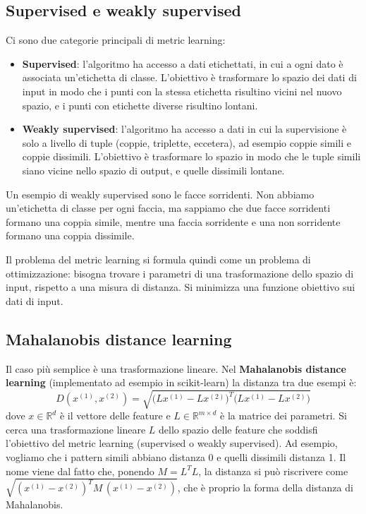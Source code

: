 \subsection{Supervised e weakly supervised}
Ci sono due categorie principali di metric learning:
\begin{itemize}
    \item \textbf{Supervised}: l'algoritmo ha accesso a dati etichettati, in cui a ogni dato è associata un'etichetta di classe. L'obiettivo è trasformare lo spazio dei dati di input in modo che i punti con la stessa etichetta risultino vicini nel nuovo spazio, e i punti con etichette diverse risultino lontani.
    \item \textbf{Weakly supervised}: l'algoritmo ha accesso a dati in cui la supervisione è solo a livello di tuple (coppie, triplette, eccetera), ad esempio coppie simili e coppie dissimili. L'obiettivo è trasformare lo spazio in modo che le tuple simili siano vicine nello spazio di output, e quelle dissimili lontane.
\end{itemize}
Un esempio di weakly supervised sono le facce sorridenti. Non abbiamo un'etichetta di classe per ogni faccia, ma sappiamo che due facce sorridenti formano una coppia simile, mentre una faccia sorridente e una non sorridente formano una coppia dissimile.

Il problema del metric learning si formula quindi come un problema di ottimizzazione: bisogna trovare i parametri di una trasformazione dello spazio di input, rispetto a una misura di distanza. Si minimizza una funzione obiettivo sui dati di input.

\subsection{Mahalanobis distance learning}
Il caso più semplice è una trasformazione lineare. Nel \textbf{Mahalanobis distance learning} (implementato ad esempio in scikit-learn) la distanza tra due esempi è:
\[
D(x^{(1)}, x^{(2)}) = \sqrt{\big(Lx^{(1)} - Lx^{(2)}\big)^T \big(Lx^{(1)} - Lx^{(2)}\big)}
\]
dove $x \in \mathbb{R}^d$ è il vettore delle feature e $L \in \mathbb{R}^{m \times d}$ è la matrice dei parametri. Si cerca una trasformazione lineare $L$ dello spazio delle feature che soddisfi l'obiettivo del metric learning (supervised o weakly supervised). Ad esempio, vogliamo che i pattern simili abbiano distanza 0 e quelli dissimili distanza 1. Il nome viene dal fatto che, ponendo $M = L^T L$, la distanza si può riscrivere come $\sqrt{(x^{(1)} - x^{(2)})^T M\, (x^{(1)} - x^{(2)})}$, che è proprio la forma della distanza di Mahalanobis.

